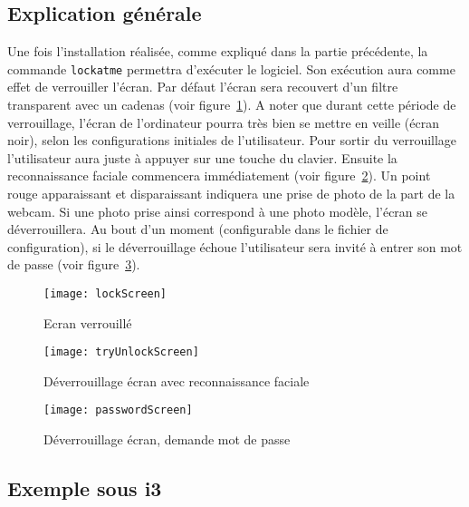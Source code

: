 \subsection{Explication générale}
Une fois l'installation réalisée, comme expliqué dans la partie précédente,
la commande \verb|lockatme| permettra d'exécuter le logiciel. Son
exécution aura comme effet de verrouiller l'écran. Par défaut l'écran sera
recouvert d'un filtre transparent avec un cadenas (voir figure~\ref{fig:lockScreen}).
A noter que durant cette période de verrouillage, l'écran de l'ordinateur pourra très bien
se mettre en veille (écran noir), selon les configurations initiales de
l'utilisateur.
Pour sortir du verrouillage l'utilisateur aura juste à appuyer sur une touche
du clavier. Ensuite la reconnaissance faciale commencera immédiatement (voir
figure~\ref{fig:tryUnlockScreen}).
Un point rouge apparaissant et disparaissant indiquera une prise de
photo de la part de la webcam. Si une photo prise ainsi correspond à une photo
modèle, l'écran se déverrouillera. Au bout d'un moment (configurable dans le
fichier de configuration), si le déverrouillage échoue l'utilisateur sera invité à
entrer son mot de passe (voir figure~\ref{fig:passwordScreen}).
\newpage
\begin{figure}[h]
  \begin{center}
  \texttt{[image: lockScreen]}
  \caption{Ecran verrouillé}
  \label{fig:lockScreen}
\end{center}
\end{figure}

\begin{figure}[h]
  \begin{center}
  \texttt{[image: tryUnlockScreen]}
  \caption{Déverrouillage écran avec reconnaissance faciale}
  \label{fig:tryUnlockScreen}
\end{center}
\end{figure}
\newpage

\begin{figure}[h]
  \begin{center}
  \texttt{[image: passwordScreen]}
  \caption{Déverrouillage écran, demande mot de passe}
  \label{fig:passwordScreen}
\end{center}
\end{figure}

\subsection{Exemple sous i3}
